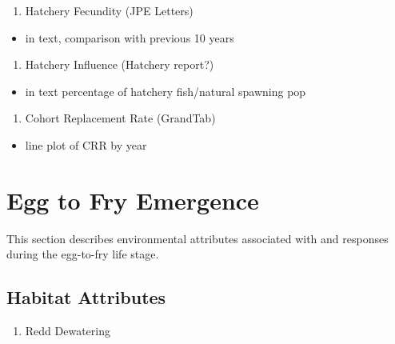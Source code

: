 \documentclass[
]{book}
\providecommand{\tightlist}{%
  \setlength{\itemsep}{0pt}\setlength{\parskip}{0pt}}
\theoremstyle{definition}
\theoremstyle{definition}
\theoremstyle{definition}
\theoremstyle{definition}
\theoremstyle{remark}
\begin{document}
\begin{enumerate}
\def\labelenumi{\arabic{enumi}.}
\setcounter{enumi}{7}
\tightlist
\item
  Hatchery Fecundity (JPE Letters)
\end{enumerate}

\begin{itemize}
\tightlist
\item
  in text, comparison with previous 10 years
\end{itemize}

\begin{enumerate}
\def\labelenumi{\arabic{enumi}.}
\setcounter{enumi}{8}
\tightlist
\item
  Hatchery Influence (Hatchery report?)
\end{enumerate}

\begin{itemize}
\tightlist
\item
  in text percentage of hatchery fish/natural spawning pop
\end{itemize}

\begin{enumerate}
\def\labelenumi{\arabic{enumi}.}
\setcounter{enumi}{9}
\tightlist
\item
  Cohort Replacement Rate (GrandTab)
\end{enumerate}

\begin{itemize}
\tightlist
\item
  line plot of CRR by year
\end{itemize}

\hypertarget{egg-to-fry-emergence}{%
\chapter{Egg to Fry Emergence}\label{egg-to-fry-emergence}}

This section describes environmental attributes associated with and responses during the egg-to-fry life stage.

\hypertarget{habitat-attributes-1}{%
\section{Habitat Attributes}\label{habitat-attributes-1}}

\begin{enumerate}
\def\labelenumi{\arabic{enumi}.}
\tightlist
\item
  Redd Dewatering
\end{enumerate}
\end{document}
